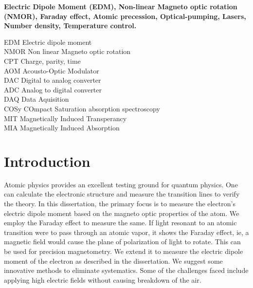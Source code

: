 \begin{frontmatter}
\makecontents

\keywords
{\large\bf{
Electric Dipole Moment (EDM), Non-linear Magneto optic rotation (NMOR), Faraday effect, Atomic precession, Optical-pumping, Lasers, Number density, Temperature control.
}}

\notations
EDM Electric dipole moment\\
NMOR Non linear Magneto optic rotation\\
CPT	Charge, parity, time \\
AOM Acousto-Optic Modulator \\
DAC Digital to analog converter\\
ADC Analog to digital converter\\
DAQ Data Aquisition\\
COSy COmpact Saturation absorption spectroscopy\\
MIT Magnetically Induced Transperancy\\
MIA Magnetically Induced Absorption


\end{frontmatter}
\chapter{Introduction}

Atomic physics provides an excellent testing ground for quantum physics. One can calculate the electronic structure and measure the transition lines to verify the theory. In this dissertation, the primary focus is to measure the electron's electric dipole moment based on the magneto optic properties of the atom. We employ the Faraday effect to measure the same. If light resonant to an atomic transition were to pass through an atomic vapor, it shows the Faraday effect, ie, a magnetic field would cause the plane of polarization of light to rotate. This can be used for precision magnetometry. We extend it to measure the electric dipole moment of the electron as described in the dissertation. We suggest some innovative methods to eliminate systematics. Some of the challenges faced include applying high electric fields without causing breakdown of the air.


